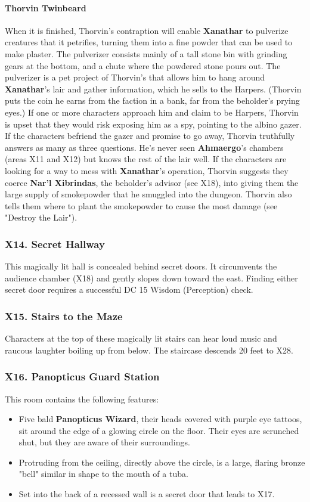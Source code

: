 \documentclass[10pt,a4paper,twoside,twocolumn,openany,nodeprecatedcode]{dndbook}
\begin{document}
\paragraph{Thorvin Twinbeard}
When it is finished, Thorvin's contraption will enable \textbf{Xanathar} to pulverize creatures that it petrifies, turning them into a fine powder that can be used to make plaster. The pulverizer consists mainly of a tall stone bin with grinding gears at the bottom, and a chute where the powdered stone pours out.
The pulverizer is a pet project of Thorvin's that allows him to hang around \textbf{Xanathar}'s lair and gather information, which he sells to the Harpers. (Thorvin puts the coin he earns from the faction in a bank, far from the beholder's prying eyes.) If one or more characters approach him and claim to be Harpers, Thorvin is upset that they would risk exposing him as a spy, pointing to the albino gazer. If the characters befriend the gazer and promise to go away, Thorvin truthfully answers as many as three questions. He's never seen \textbf{Ahmaergo}'s chambers (areas X11 and X12) but knows the rest of the lair well.
If the characters are looking for a way to mess with \textbf{Xanathar}'s operation, Thorvin suggests they coerce \textbf{Nar'l Xibrindas}, the beholder's advisor (see X18), into giving them the large supply of smokepowder that he smuggled into the dungeon. Thorvin also tells them where to plant the smokepowder to cause the most damage (see "Destroy the Lair").
\subsubsection{X14. Secret Hallway}
This magically lit hall is concealed behind secret doors. It circumvents the audience chamber (X18) and gently slopes down toward the east. Finding either secret door requires a successful DC 15 Wisdom (Perception) check.
\subsubsection{X15. Stairs to the Maze}
Characters at the top of these magically lit stairs can hear loud music and raucous laughter boiling up from below. The staircase descends 20 feet to X28.
\subsubsection{X16. Panopticus Guard Station}
This room contains the following features:
\begin{itemize}

\item Five bald \textbf{Panopticus Wizard}, their heads covered with purple eye tattoos, sit around the edge of a glowing circle on the floor. Their eyes are scrunched shut, but they are aware of their surroundings.
\item Protruding from the ceiling, directly above the circle, is a large, flaring bronze "bell" similar in shape to the mouth of a tuba.
\item Set into the back of a recessed wall is a secret door that leads to X17.
\end{itemize}
\end{document}
